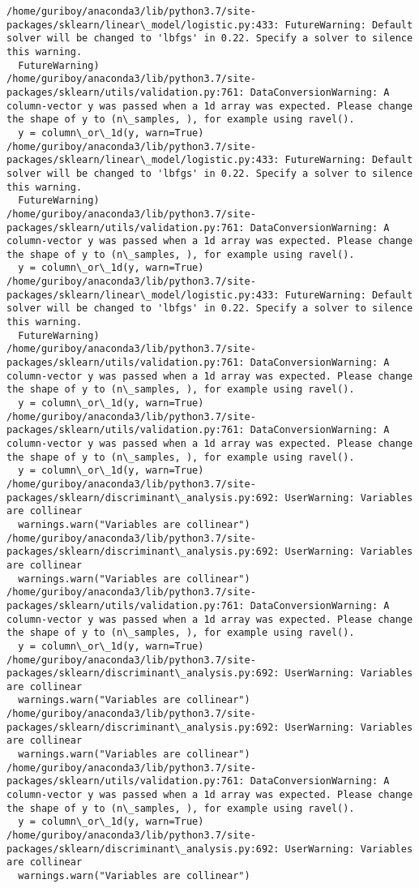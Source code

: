 \documentclass[11pt]{article}
\begin{document}
    \begin{Verbatim}[commandchars=\\\{\}]
/home/guriboy/anaconda3/lib/python3.7/site-packages/sklearn/linear\_model/logistic.py:433: FutureWarning: Default solver will be changed to 'lbfgs' in 0.22. Specify a solver to silence this warning.
  FutureWarning)
/home/guriboy/anaconda3/lib/python3.7/site-packages/sklearn/utils/validation.py:761: DataConversionWarning: A column-vector y was passed when a 1d array was expected. Please change the shape of y to (n\_samples, ), for example using ravel().
  y = column\_or\_1d(y, warn=True)
/home/guriboy/anaconda3/lib/python3.7/site-packages/sklearn/linear\_model/logistic.py:433: FutureWarning: Default solver will be changed to 'lbfgs' in 0.22. Specify a solver to silence this warning.
  FutureWarning)
/home/guriboy/anaconda3/lib/python3.7/site-packages/sklearn/utils/validation.py:761: DataConversionWarning: A column-vector y was passed when a 1d array was expected. Please change the shape of y to (n\_samples, ), for example using ravel().
  y = column\_or\_1d(y, warn=True)
/home/guriboy/anaconda3/lib/python3.7/site-packages/sklearn/linear\_model/logistic.py:433: FutureWarning: Default solver will be changed to 'lbfgs' in 0.22. Specify a solver to silence this warning.
  FutureWarning)
/home/guriboy/anaconda3/lib/python3.7/site-packages/sklearn/utils/validation.py:761: DataConversionWarning: A column-vector y was passed when a 1d array was expected. Please change the shape of y to (n\_samples, ), for example using ravel().
  y = column\_or\_1d(y, warn=True)
/home/guriboy/anaconda3/lib/python3.7/site-packages/sklearn/utils/validation.py:761: DataConversionWarning: A column-vector y was passed when a 1d array was expected. Please change the shape of y to (n\_samples, ), for example using ravel().
  y = column\_or\_1d(y, warn=True)
/home/guriboy/anaconda3/lib/python3.7/site-packages/sklearn/discriminant\_analysis.py:692: UserWarning: Variables are collinear
  warnings.warn("Variables are collinear")
/home/guriboy/anaconda3/lib/python3.7/site-packages/sklearn/discriminant\_analysis.py:692: UserWarning: Variables are collinear
  warnings.warn("Variables are collinear")
/home/guriboy/anaconda3/lib/python3.7/site-packages/sklearn/utils/validation.py:761: DataConversionWarning: A column-vector y was passed when a 1d array was expected. Please change the shape of y to (n\_samples, ), for example using ravel().
  y = column\_or\_1d(y, warn=True)
/home/guriboy/anaconda3/lib/python3.7/site-packages/sklearn/discriminant\_analysis.py:692: UserWarning: Variables are collinear
  warnings.warn("Variables are collinear")
/home/guriboy/anaconda3/lib/python3.7/site-packages/sklearn/discriminant\_analysis.py:692: UserWarning: Variables are collinear
  warnings.warn("Variables are collinear")
/home/guriboy/anaconda3/lib/python3.7/site-packages/sklearn/utils/validation.py:761: DataConversionWarning: A column-vector y was passed when a 1d array was expected. Please change the shape of y to (n\_samples, ), for example using ravel().
  y = column\_or\_1d(y, warn=True)
/home/guriboy/anaconda3/lib/python3.7/site-packages/sklearn/discriminant\_analysis.py:692: UserWarning: Variables are collinear
  warnings.warn("Variables are collinear")


\end{Verbatim}
\end{document}
